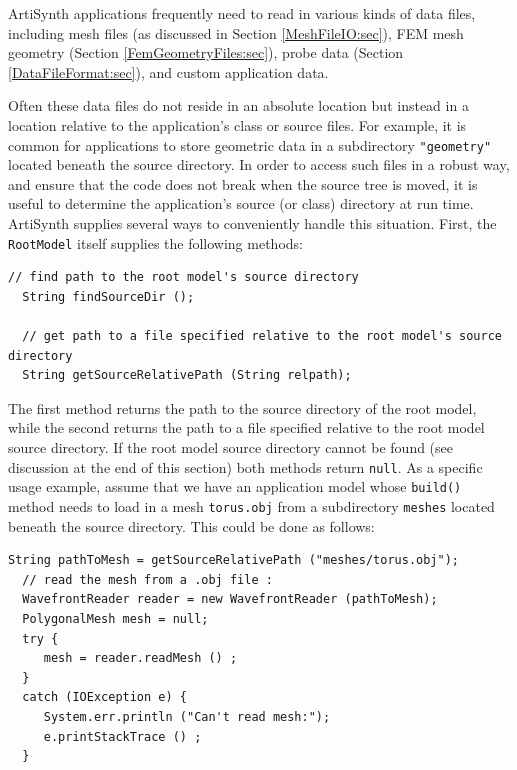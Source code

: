 ArtiSynth applications frequently need to read in various kinds of
data files, including mesh files (as discussed in Section
\ref{MeshFileIO:sec}), FEM mesh geometry (Section
\ref{FemGeometryFiles:sec}), probe data (Section
\ref{DataFileFormat:sec}), and custom application data.

Often these data files do not reside in an absolute location but
instead in a location relative to the application's class or source
files.  For example, it is common for applications to store geometric
data in a subdirectory {\tt "geometry"} located beneath the source
directory. In order to access such files in a robust way, and ensure
that the code does not break when the source tree is moved, it is
useful to determine the application's source (or class) directory at
run time. ArtiSynth supplies several ways to conveniently handle this
situation. First, the {\tt RootModel} itself supplies the following
methods:
\begin{lstlisting}[]
  // find path to the root model's source directory
  String findSourceDir ();

  // get path to a file specified relative to the root model's source directory
  String getSourceRelativePath (String relpath);
\end{lstlisting}
%
The first method returns the path to the source directory of the
root model, while the second returns the path to a file specified
relative to the root model source directory. If the root model source
directory cannot be found (see discussion at the end of this section)
both methods return {\tt null}.
%
As a specific usage example, assume that we have an application model
whose {\tt build()} method needs to load in a mesh {\tt torus.obj}
from a subdirectory {\tt meshes} located beneath the source
directory. This could be done as follows:
%
\begin{lstlisting}[]
  String pathToMesh = getSourceRelativePath ("meshes/torus.obj");
  // read the mesh from a .obj file :
  WavefrontReader reader = new WavefrontReader (pathToMesh);
  PolygonalMesh mesh = null;
  try {
     mesh = reader.readMesh () ;
  }
  catch (IOException e) {
     System.err.println ("Can't read mesh:");
     e.printStackTrace () ;
  }
\end{lstlisting}


